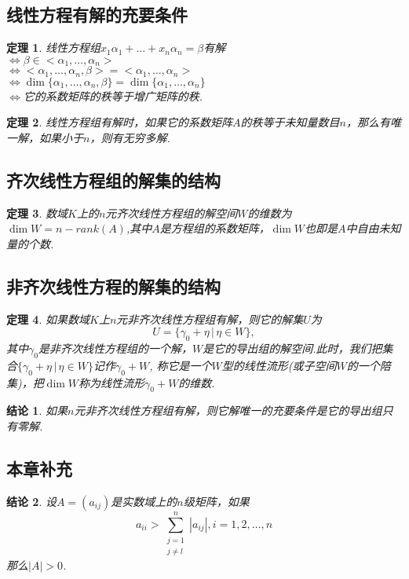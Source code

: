 \documentclass[UTF8]{article}
\newtheorem{thrm}{定理}[subsection]
\newtheorem{ccl}{结论}[subsection]
\begin{document}
\subsection{线性方程有解的充要条件}
\begin{thrm}
  线性方程组$x_1\alpha_1+\ldots+x_n\alpha_n=\beta$有解\\
  $\Longleftrightarrow \beta \in <\alpha_1,\ldots,\alpha_n>$\\
  $\Longleftrightarrow <\alpha_1,\ldots,\alpha_n,\beta>=<\alpha_1,\ldots,\alpha_n>$\\
  $\Longleftrightarrow \dim\{\alpha_1,\ldots,\alpha_n,\beta\}=\dim\{\alpha_1,\ldots,\alpha_n\}$ \\
  $\Longleftrightarrow$它的系数矩阵的秩等于增广矩阵的秩.
\end{thrm}
\begin{thrm}
  线性方程组有解时，如果它的系数矩阵$A$的秩等于未知量数目$n$，那么有唯一解，如果小于$n$，则有无穷多解.
\end{thrm}

\subsection{齐次线性方程组的解集的结构}
\begin{thrm}
  数域$K$上的$n$元齐次线性方程组的解空间$W$的维数为 $\dim W=n-rank(A)$,其中$A$是方程组的系数矩阵，$\dim W$也即是$A$中自由未知量的个数.
\end{thrm}

\subsection{非齐次线性方程的解集的结构}
\begin{thrm}
  如果数域$K$上$n$元非齐次线性方程组有解，则它的解集$U$为
  $$U=\{\gamma_0+\eta\,|\,\eta \in W\},$$
  其中$\gamma_0$是非齐次线性方程组的一个解，$W$是它的导出组的解空间.此时，我们把集合$\{\gamma_0+\eta\,|\,\eta \in W\}$记作$\gamma_0+W$,
  称它是一个$W$型的线性流形(或子空间$W$的一个陪集)，把$\dim W$称为线性流形$\gamma_0+W$的维数.
\end{thrm}
\begin{ccl}
  如果$n$元非齐次线性方程组有解，则它解唯一的充要条件是它的导出组只有零解.
\end{ccl}

\subsection{本章补充}
\begin{ccl}
  设$A=(a_{ij})$是实数域上的$n$级矩阵，如果
  $$ a_{ii}>\sum_{\substack{j=1\\j\ne l}}^n|a_{ij}|,i=1,2,\ldots,n $$
  那么$|A|>0$.
\end{ccl}
\end{document}
